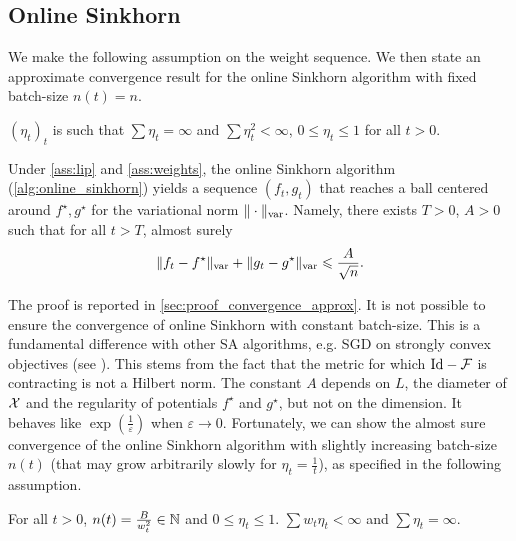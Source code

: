 \subsection{Online Sinkhorn}

We make the following \citet{robbins1951stochastic} assumption on the weight sequence. We then state an approximate convergence result for the online Sinkhorn algorithm with fixed batch-size $n(t) = n$.

\begin{assumption}\label{ass:weights}
    ${(\eta_t)}_t$ is such that
    $\sum \eta_t = \infty$ and $\sum \eta_t^2 < \infty$, $0 \leq \eta_t \leq 1$ for all $t > 0$.
\end{assumption}

\begin{proposition}\label{prop:convergence_approx}
    Under \autoref{ass:lip} and \ref{ass:weights}, the online Sinkhorn algorithm (\autoref{alg:online_sinkhorn}) yields a sequence $(f_t, g_t)$ that reaches a
    ball centered around $f^\star, g^\star$ for the variational norm $\Vert
    \cdot \Vert_{\text{\upshape var}}$.
     Namely, there exists $T > 0$, $A > 0$ such that for all $t > T$, almost surely
    \begin{equation}
        \Vert f_t - f^\star \Vert_{\text{\upshape var}}
        + \Vert g_t - g^\star \Vert_{\text{\upshape var}} 
        \leqslant \frac{A}{\sqrt{n}} .
    \end{equation}
\end{proposition}

The proof is reported in \autoref{sec:proof_convergence_approx}. It is not possible
to ensure the convergence of online Sinkhorn with constant batch-size. This is a
fundamental difference with other SA algorithms, e.g. SGD on strongly convex
objectives (see \cite{moulines_non-asymptotic_2011}). This stems from the fact
that the metric for which $\text{Id} - \mathcal{F}$ is contracting is
not a Hilbert norm. The constant $A$ depends on $L$, the diameter of $\mathcal{X}$ and the regularity of potentials $f^\star$ and $g^\star$, but not on the dimension. It behaves like $\exp(\frac{1}{\varepsilon})$ when
$\varepsilon \to 0$.
Fortunately, we can show the almost sure convergence of the online Sinkhorn algorithm
with slightly increasing batch-size $n(t)$ (that may grow arbitrarily slowly for $\eta_t = \frac{1}{t}$), as specified in the following
assumption.

\begin{assumption}\label{ass:double_weights}
    For all $t > 0$, $n(t) = \frac{B}{w_t^2} \in \mathbb{N}$ and $0 \leq \eta_t \leq
    1$. $\sum w_t \eta_t < \infty$ and $\sum \eta_t = \infty$.
\end{assumption}

